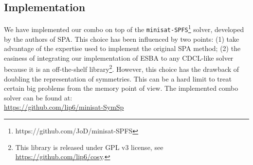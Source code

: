 \subsection{Implementation}
We have implemented our combo on top of the
\texttt{minisat-SPFS}\footnote{https://github.com/JoD/minisat-SPFS} solver,
developed by the authors of SPA.
This choice has been influenced by two points: (1) take advantage of the
expertise used to implement the original SPA method; (2) the easiness of
integrating our implementation of ESBA to any CDCL-like solver because it is an
off-the-shelf library\footnote{This library is released under GPL v3 license,
see \url{https://github.com/lip6/cosy}.}.
However, this choice has the drawback of doubling the representation of
symmetries. This can be a hard limit to treat certain big problems from the
memory point of view.
The implemented combo solver can be found at:\\
\mbox{\url{https://github.com/lip6/minisat-SymSp}}
